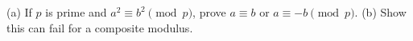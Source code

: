 (a) If $p$ is prime and $a^2\equiv b^2\pmod p$, prove $a\equiv b$ or $a\equiv-b\pmod p$. (b) Show this can fail for a composite modulus.
